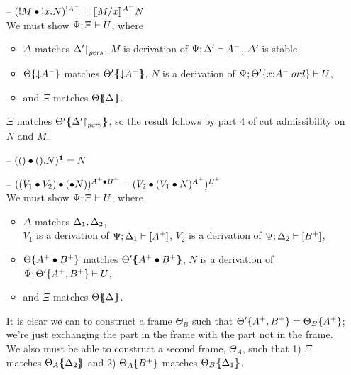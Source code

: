 \begin{itemize}
\item[--] $(\subst{\tbangr{M}}{\tbangl{x}{N}})^{{!}A^-}
           = \rsubsta{M}{x}{N}{A^-}$ \smallskip\\
  We must show $\foc{\Psi}{\Xi}{U}$, where
  \begin{itemize}
  \item $\Delta$ matches $\restrictto{\Delta'}{\mpers}$,
        $M$ is derivation of $\foc{\Psi}{\Delta'}{A^-}$, 
        $\Delta'$ is stable,
  \item $\tackon{\Theta}{{\downarrow}A^-}$ matches 
        $\frameoff{\Theta'}{{\downarrow}A^-}$,
        $N$ is a derivation of 
        $\foc{\Psi}{\tackon{\Theta'}{x{:}\istrue{A^-}}}{U}$,
  \item and $\Xi$ matches $\frameoff{\Theta}{\Delta}$.
  \end{itemize}

  $\Xi$ matches $\frameoff{\Theta'}{\restrictto{\Delta'}{\mpers}}$,
  so the result follows by
  part 4 of cut admissibility on $N$ and $M$. 

\smallskip

\item[--] $(\subst{\toner}{\tonel{N}})^{\one} = N$

\item[--] $(\subst{(\tfuser{V_1}{V_2})}{(\tfusel{N}}))^{A^+ \fuse B^+}
           = (\subst{V_2}{(\subst{V_1}{N})^{A^+}})^{B^+}$ \smallskip\\
  We must show $\foc{\Psi}{\Xi}{U}$, where
  \begin{itemize}
  \item $\Delta$ matches $\matchconj{\Delta_1}{\Delta_2}$,\\
        $V_1$ is a derivation of $\foc{\Psi}{\Delta_1}{[A^+]}$,
        $V_2$ is a derivation of $\foc{\Psi}{\Delta_2}{[B^+]}$,
  \item $\tackon{\Theta}{A^+ \fuse B^+}$ matches
        $\frameoff{\Theta'}{A^+ \fuse B^+}$, 
        $N$ is a derivation of 
        $\foc{\Psi}{\tackon{\Theta'}{A^+, B^+}}{U}$, 
  \item and $\Xi$ matches $\frameoff{\Theta}{\Delta}$.
  \end{itemize}

  It is clear we can to construct a frame $\Theta_B$ such that
  $\tackon{\Theta'}{\mkconj{A^+}{B^+}} = \tackon{\Theta_B}{A^+}$; we're just exchanging
  the part in the frame with the part not in the frame. We also 
  must be able to construct a second frame, $\Theta_A$, such that
  1) $\Xi$ matches $\frameoff{\Theta_A}{\Delta_2}$ and 
  2) $\tackon{\Theta_A}{B^+}$ matches $\frameoff{\Theta_B}{\Delta_1}$.


\end{itemize}
